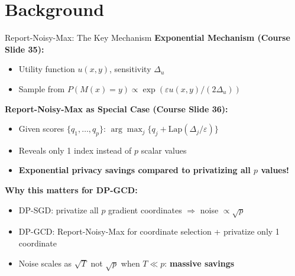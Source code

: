 \documentclass[10pt]{beamer}
\begin{document}
\section{Background}

\begin{frame}{Report-Noisy-Max: The Key Mechanism}
\textbf{Exponential Mechanism (Course Slide 35):}
\begin{itemize}
\item Utility function $u(x, y)$, sensitivity $\Delta_u$
\item Sample from $P(M(x) = y) \propto \exp(\varepsilon u(x,y)/(2\Delta_u))$
\end{itemize}

\vspace{0.8em}
\textbf{Report-Noisy-Max as Special Case (Course Slide 36):}
\begin{itemize}
\item Given scores $\{q_1, \ldots, q_p\}$: $\arg\max_j \{q_j + \text{Lap}(\Delta_j/\varepsilon)\}$
\item Reveals only \alert{1 index} instead of $p$ scalar values
\item \textbf{Exponential privacy savings compared to privatizing all $p$ values!}
\end{itemize}

\vspace{0.8em}
\textbf{Why this matters for DP-GCD:}
\begin{itemize}
\item DP-SGD: privatize all $p$ gradient coordinates $\Rightarrow$ noise $\propto \sqrt{p}$
\item DP-GCD: Report-Noisy-Max for coordinate selection + privatize only 1 coordinate
\item Noise scales as $\sqrt{T}$ not $\sqrt{p}$ when $T \ll p$: \textbf{massive savings}
\end{itemize}
\end{frame}
\end{document}
